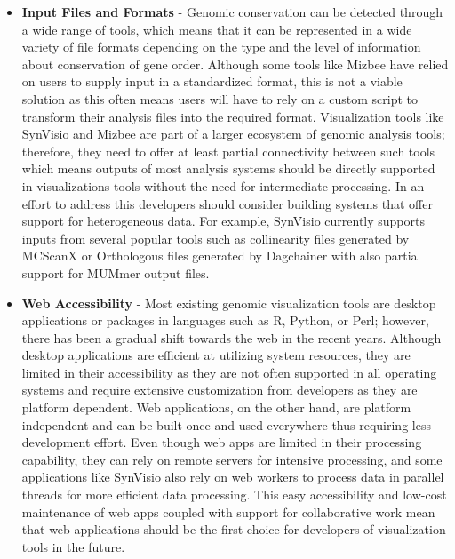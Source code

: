 \begin{itemize}
    \item \textbf{Input Files and Formats} - Genomic conservation can be detected through a wide range of tools, which means that it can be represented in a wide variety of file formats depending on the type and the level of information about conservation of gene order.
    Although some tools like Mizbee have relied on users to supply input in a standardized format, this is not a viable solution as this often means users will have to rely on a custom script to transform their analysis files into the required format. Visualization tools like SynVisio and Mizbee are part of a larger ecosystem of genomic analysis tools; therefore, they need to offer at least partial connectivity between such tools which means outputs of most analysis systems should be directly supported in visualizations tools without the need for intermediate processing. In an effort to address this developers should consider building systems that offer support for heterogeneous data. For example, SynVisio currently supports inputs from several popular tools such as collinearity files generated by MCScanX or Orthologous files generated by Dagchainer with also partial support for MUMmer output files. 
 
    \item \textbf{Web Accessibility} - Most existing genomic visualization tools are desktop applications or packages in languages such as R, Python, or Perl; however, there has been a gradual shift towards the web in the recent years. Although desktop applications are efficient at utilizing system resources, they are limited in their accessibility as they are not often supported in all operating systems and require extensive customization from developers as they are platform dependent. Web applications, on the other hand, are platform independent and can be built once and used everywhere thus requiring less development effort. Even though web apps are limited in their processing capability, they can rely on remote servers for intensive processing, and some applications like SynVisio also rely on web workers to process data in parallel threads for more efficient data processing. This easy accessibility and low-cost maintenance of web apps coupled with support for collaborative work mean that web applications should be the first choice for developers of visualization tools in the future.
    

\end{itemize}
